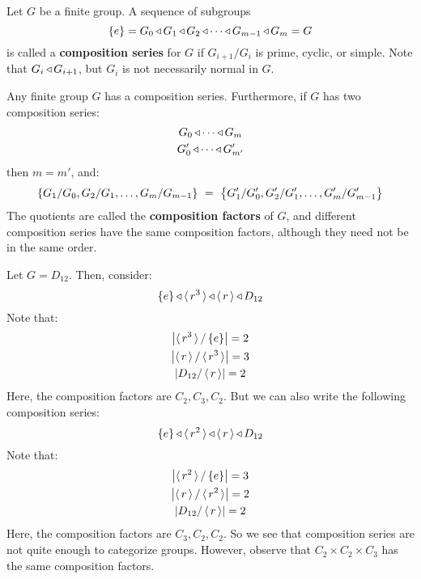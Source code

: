 \begin{defn}
    Let $ G $ be a finite group. A sequence of subgroups
    \begin{equation*}
        \left\{{e}\right\} = G_{0} \operatorname{\triangleleft} G_{1} \operatorname{\triangleleft} G_{2} \operatorname{\triangleleft} \cdots \operatorname{\triangleleft} G_{m-1} \operatorname{\triangleleft} G_{m} = G
    \end{equation*}
    is called a \textbf{composition series} for $ G $ if $ G_{i+1}/G_{i} $ is prime, cyclic,
    or simple. \vsp
    Note that $ G_{i} \operatorname{\triangleleft} G_{i+1} $, but $ G_{i} $ is not necessarily normal in $ G $.
\end{defn}

\begin{thm}[title=Jordan-Holder Theorem]
    Any finite group $ G $ has a composition series.
    Furthermore, if $ G $ has two composition series:
    \begin{gather*}
        G_{0} \operatorname{\triangleleft} \cdots \operatorname{\triangleleft} G_{m} \\
        G_{0}' \operatorname{\triangleleft} \cdots \operatorname{\triangleleft} G_{m'}'
    \end{gather*}
    then $ m = m' $, and:
    \begin{equation*}
        \left\{{G_{1}/G_{0}, G_{2}/G_{1}, \dots, G_{m}/G_{m-1}}\right\} \ = \
        \left\{{G_{1}'/G_{0}', G_{2}'/G_{1}', \dots, G_{m}'/G_{m-1}'}\right\}
    \end{equation*}
    The quotients are called the \textbf{composition factors} of $ G $, and different composition
    series have the same composition factors, although they need not be in the same order.
\end{thm}

\begin{xmp}[source=Primary Source Material]
    Let $ G = D_{12} $. Then, consider:
    \begin{equation*}
        \left\{{e}\right\} \operatorname{\triangleleft} \operatorname{\langle} r^{3} \operatorname{\rangle} \operatorname{\triangleleft} \operatorname{\langle} r \operatorname{\rangle} \operatorname{\triangleleft} D_{12}
    \end{equation*}
    Note that:
    \begin{gather*}
        \abs{\operatorname{\langle} r^{3} \operatorname{\rangle} / \left\{{e}\right\}} = 2 \\
        \abs{\operatorname{\langle} r \operatorname{\rangle}/\operatorname{\langle} r^{3} \operatorname{\rangle}} = 3 \\
        \abs{D_{12} / \operatorname{\langle} r \operatorname{\rangle}} = 2
    \end{gather*}
    Here, the composition factors are $ C_{2}, C_{3}, C_{2} $.
    But we can also write the following composition series:
    \begin{equation*}
        \left\{{e}\right\} \operatorname{\triangleleft} \operatorname{\langle} r^{2} \operatorname{\rangle} \operatorname{\triangleleft} \operatorname{\langle} r \operatorname{\rangle} \operatorname{\triangleleft} D_{12}
    \end{equation*}
    Note that:
    \begin{gather*}
        \abs{\operatorname{\langle} r^{2} \operatorname{\rangle} / \left\{{e}\right\}} = 3 \\
        \abs{\operatorname{\langle} r \operatorname{\rangle}/\operatorname{\langle} r^{2} \operatorname{\rangle}} = 2 \\
        \abs{D_{12} / \operatorname{\langle} r \operatorname{\rangle}} = 2
    \end{gather*}
    Here, the composition factors are $ C_{3}, C_{2}, C_{2} $. \vsp
    So we see that composition series are not quite enough to categorize groups.
    However, observe that $ C_{2} \times C_{2} \times C_{3} $ has the same composition factors.
\end{xmp}

